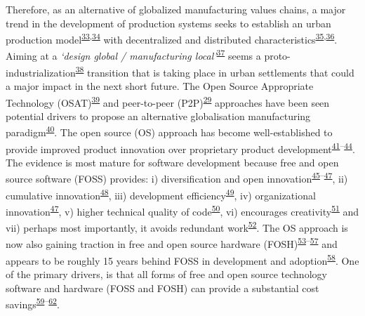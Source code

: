\documentclass[
  12pt,
  a4paperpaper,
  onecolumn]{article}
\begin{document}
Therefore, as an alternative of globalized manufacturing values chains,
a major trend in the development of production systems seeks to
establish an urban production
model\textsuperscript{\protect\hyperlink{ref-Herrmann2020}{33},\protect\hyperlink{ref-juraschek2022}{34}}
with decentralized and distributed
characteristics\textsuperscript{\protect\hyperlink{ref-priavolou2022}{35},\protect\hyperlink{ref-cerdas2017}{36}}.
Aiming at a \emph{`design global / manufacturing
local'}\textsuperscript{\protect\hyperlink{ref-Kostakis2018}{37}} seems
a
proto-industrialization\textsuperscript{\protect\hyperlink{ref-sabel1985}{38}}
transition that is taking place in urban settlements that could a major
impact in the next short future. The Open Source Appropriate Technology
(OSAT)\textsuperscript{\protect\hyperlink{ref-Pearce2010}{39}} and
peer-to-peer
(P2P)\textsuperscript{\protect\hyperlink{ref-Kostakis2013}{29}}
approaches have been seen potential drivers to propose an alternative
globalisation manufacturing
paradigm\textsuperscript{\protect\hyperlink{ref-Heikkinen2020a}{40}}.
The open source (OS) approach has become well-established to provide
improved product innovation over proprietary product
development\textsuperscript{\protect\hyperlink{ref-dibona1999}{41}--\protect\hyperlink{ref-deek2007}{44}}.
The evidence is most mature for software development because free and
open source software (FOSS) provides: i) diversification and open
innovation\textsuperscript{\protect\hyperlink{ref-colombo2014}{45}--\protect\hyperlink{ref-alexy2013}{47}},
ii) cumulative
innovation\textsuperscript{\protect\hyperlink{ref-boudreau2016}{48}},
iii) development
efficiency\textsuperscript{\protect\hyperlink{ref-hienerth2014}{49}},
iv) organizational
innovation\textsuperscript{\protect\hyperlink{ref-alexy2013}{47}}, v)
higher technical quality of
code\textsuperscript{\protect\hyperlink{ref-soderberg2015}{50}}, vi)
encourages
creativity\textsuperscript{\protect\hyperlink{ref-martinez2015}{51}} and
vii) perhaps most importantly, it avoids redundant
work\textsuperscript{\protect\hyperlink{ref-Ardal2016}{52}}. The OS
approach is now also gaining traction in free and open source hardware
(FOSH)\textsuperscript{\protect\hyperlink{ref-thompson2011}{53}--\protect\hyperlink{ref-li2018}{57}}
and appears to be roughly 15 years behind FOSS in development and
adoption\textsuperscript{\protect\hyperlink{ref-pearce2018}{58}}. One of
the primary drivers, is that all forms of free and open source
technology software and hardware (FOSS and FOSH) can provide a
substantial cost
savings\textsuperscript{\protect\hyperlink{ref-petch2014}{59}--\protect\hyperlink{ref-wittbrodt2013}{62}}.
\end{document}
